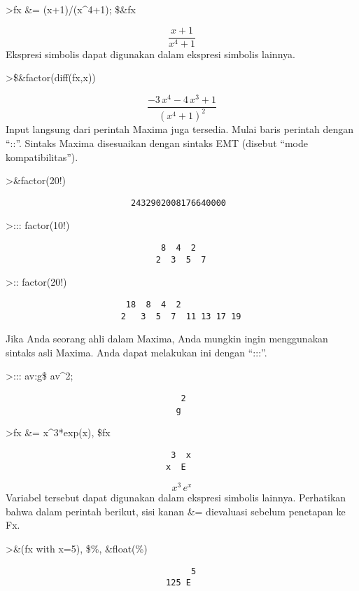 \documentclass[
]{book}
\begin{document}
\textgreater fx \&= (x+1)/(x\^{}4+1); \$\&fx

\[\frac{x+1}{x^4+1}\]Ekspresi simbolis dapat digunakan dalam ekspresi simbolis lainnya.

\textgreater\$\&factor(diff(fx,x))

\[\frac{-3\,x^4-4\,x^3+1}{\left(x^4+1\right)^2}\]Input langsung dari perintah Maxima juga tersedia. Mulai baris perintah dengan ``::''. Sintaks Maxima disesuaikan dengan sintaks EMT (disebut ``mode kompatibilitas'').

\textgreater\&factor(20!)

\begin{verbatim}
                         2432902008176640000
\end{verbatim}

\textgreater::: factor(10!)

\begin{verbatim}
                               8  4  2
                              2  3  5  7
\end{verbatim}

\textgreater:: factor(20!)

\begin{verbatim}
                        18  8  4  2
                       2   3  5  7  11 13 17 19
\end{verbatim}

Jika Anda seorang ahli dalam Maxima, Anda mungkin ingin menggunakan sintaks asli Maxima. Anda dapat melakukan ini dengan ``:::''.

\textgreater::: av:g\$ av\^{}2;

\begin{verbatim}
                                   2
                                  g
\end{verbatim}

\textgreater fx \&= x\^{}3*exp(x), \$fx

\begin{verbatim}
                                 3  x
                                x  E
\end{verbatim}

\[x^3\,e^{x}\]Variabel tersebut dapat digunakan dalam ekspresi simbolis lainnya. Perhatikan bahwa dalam perintah berikut, sisi kanan \&= dievaluasi sebelum penetapan ke Fx.

\textgreater\&(fx with x=5), \$\%, \&float(\%)

\begin{verbatim}
                                     5
                                125 E
\end{verbatim}
\end{document}
